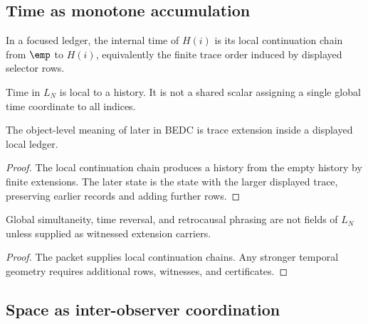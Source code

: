 \subsection{Time as monotone accumulation}
\label{subsec:philosophy-time-monotone-accumulation}

\begin{definition}
\label{def:philosophy-bedc-internal-time}
In a focused ledger, the internal time of \(H(i)\) is its local
continuation chain from \(\emp\) to \(H(i)\), equivalently the finite
trace order induced by displayed selector rows.
\end{definition}

\begin{definition}
\label{def:philosophy-local-time}
Time in \(L_N\) is local to a history. It is not a shared scalar
assigning a single global time coordinate to all indices.
\end{definition}

\begin{theorem}
\label{thm:philosophy-time-monotone-record-accumulation}
The object-level meaning of later in BEDC is trace extension inside a
displayed local ledger.
\end{theorem}
\begin{proof}
The local continuation chain produces a history from the empty history
by finite extensions. The later state is the state with the larger
displayed trace, preserving earlier records and adding further rows.
\end{proof}

\begin{corollary}
\label{cor:philosophy-global-simultaneity-not-carrier-field}
Global simultaneity, time reversal, and retrocausal phrasing are not
fields of \(L_N\) unless supplied as witnessed extension carriers.
\end{corollary}
\begin{proof}
The packet supplies local continuation chains. Any stronger temporal
geometry requires additional rows, witnesses, and certificates.
\end{proof}

\subsection{Space as inter-observer coordination}
\label{subsec:philosophy-space-inter-observer-coordination}


